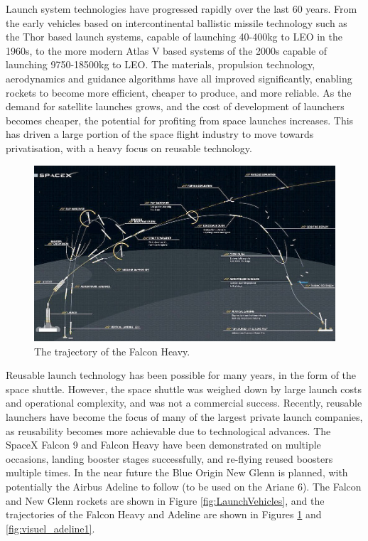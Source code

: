     Launch system technologies have progressed rapidly over the last 60 years. From the early vehicles based on intercontinental ballistic missile technology such as the Thor based launch systems, capable of launching 40-400kg to LEO in the 1960s, to the more modern Atlas V based systems of the 2000s capable of launching 9750-18500kg to LEO\cite{Kendall2010}. 
    The materials, propulsion technology, aerodynamics and guidance algorithms have all improved significantly, enabling  rockets to become more efficient, cheaper to produce, and more reliable. As the demand for satellite launches grows, and the cost of development of launchers becomes cheaper, the potential for profiting from space launches increases. 
    This has driven a large portion of the space flight industry to move towards privatisation, with a heavy focus on reusable technology. 
    \begin{figure}[ht]
    	\centering
    	\includegraphics[width=1\linewidth]{"figures/2_literature-review/FalconTrajectory"}
    	\caption{The trajectory of the Falcon Heavy\cite{FalconHeavy}.}
    	\label{fig:FalconTrajectory}
    \end{figure}
    
    Reusable launch technology has been possible for many years, in the form of the space shuttle. However, the space shuttle was weighed down by large launch costs and operational complexity, and was not a commercial success\cite{Launius2006}. Recently, reusable launchers have become the focus of many of the largest private launch companies, as reusability becomes more achievable due to technological advances\cite{Foust2018,Mosher2018}. The SpaceX Falcon 9 and Falcon Heavy have been demonstrated on multiple occasions, landing booster stages successfully, and re-flying reused boosters multiple times\cite{Foust2018}. In the near future the Blue Origin New Glenn is planned\cite{Foust2018}, with potentially the Airbus Adeline to follow (to be used on the Ariane 6)\cite{Adeline}. The Falcon and New Glenn rockets are shown in Figure \ref{fig:LaunchVehicles}, and the trajectories of the Falcon Heavy and Adeline are shown in Figures \ref{fig:FalconTrajectory} and \ref{fig:visuel_adeline1}.  
    
